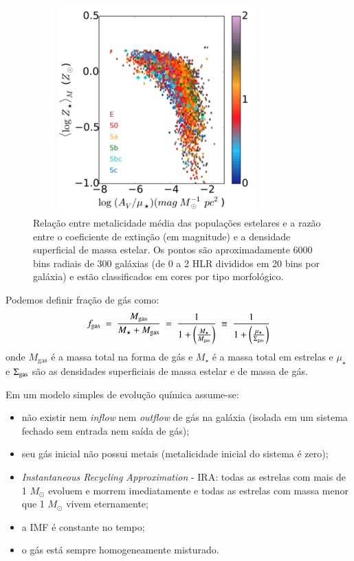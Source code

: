 \begin{figure}
	\centering
	\includegraphics[height = 8cm, width = 9.5cm]{figuras/dust2stars.pdf}
	\caption[$A_V / \mu_\star$ vs. ]
	{Relação entre metalicidade média das populações estelares e a razão entre o coeficiente de
extinção (em magnitude) e a densidade superficial de massa estelar. Os pontos são aproximadamente
6000 bins radiais de 300 galáxias (de 0 a 2 HLR divididos em 20 bins por galáxia) e estão
classificados em cores por tipo morfológico.}
	\label{fig:dust2stars}
\end{figure}

Podemos definir fração de gás como:
\begin{equation}
	f_{\mathrm{gas}}\ =\ \frac{M_{\mathrm{gas}}}{M_\star + M_{\mathrm{gas}}}\ =\ \frac{1}{1 +
	\left(\frac{M_\star}{M_{\mathrm{gas}}}\right)}\ \equiv\ \frac{1}{1 +
	\left(\frac{\mu_\star}{\SigmaGas}\right)}
	\label{eq:fgas}
\end{equation}
\noindent onde $M_{\mathrm{gas}}$ é a massa total na forma de gás e $M_\star$ é a massa total em
estrelas e $\mu_\star$ e $\Sigma_{\mathrm{gas}}$ são as densidades superficiais de massa estelar e de massa de
gás.

Em um modelo simples de evolução química assume-se:
\begin{itemize}
	\setlength\itemsep{0.2cm}
  	\item não existir nem {\em inflow} nem {\em outflow} de gás na galáxia (isolada em um sistema
fechado sem entrada nem saída de gás);
  	\item seu gás inicial não possui metais (metalicidade inicial do sistema é zero);
  	\item {\em Instantaneous Recycling Approximation} - IRA: todas as estrelas com mais de 1
$M_\odot$ evoluem e morrem imediatamente e todas as estrelas com massa menor que 1 $M_\odot$ vivem
eternamente;
	\item a IMF é constante no tempo;
	\item o gás está sempre homogeneamente misturado.
\end{itemize}

